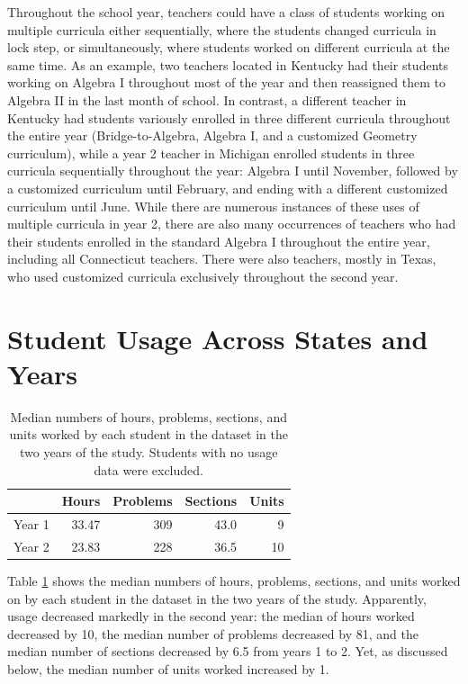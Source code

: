 \documentclass[12pt]{article}\usepackage[]{graphicx}\usepackage[]{color}
\begin{document}
Throughout the school year, teachers could have a class of students
working on multiple curricula either sequentially, where the students
changed curricula in lock step, or simultaneously, where students
worked on different curricula at the same time. As an example, two
teachers located in Kentucky had their students working on Algebra I
throughout most of the year and then reassigned them to Algebra II in
the last month of school. In contrast, a different teacher in Kentucky had students variously
enrolled in three different curricula throughout the entire year
(Bridge-to-Algebra, Algebra I, and a customized Geometry curriculum),
while a year 2 teacher in Michigan enrolled students in
three curricula sequentially throughout the year: Algebra I
until November, followed by a customized curriculum until February, and
ending with a different customized curriculum until June. While there are numerous instances of these
uses of multiple curricula in year 2, there are also many occurrences
of teachers who had their students enrolled in the standard Algebra I
throughout the entire year, including all Connecticut teachers.
There were also teachers, mostly in Texas, who used customized
curricula exclusively throughout the
second year.

\section{Student Usage Across States and Years}\label{sec:usage}

\begin{table}[ht]
\centering
\begin{tabular}{rrrrr}
  \hline
 & Hours & Problems & Sections & Units \\ 
  \hline
Year 1 & 33.47 & 309 & 43.0 & 9 \\ 
  Year 2 & 23.83 & 228 & 36.5 & 10 \\ 
   \hline
\end{tabular}
\caption{Median numbers of hours, problems, sections, and units worked by each student in the dataset in the two years of the study. Students with no usage data were excluded.} 
\label{tab:medUsage}
\end{table}



Table \ref{tab:medUsage} shows the median numbers of hours,
problems, sections, and units worked on by each student in the dataset
in the two years of the study.
Apparently, usage decreased markedly in the second year: the median
of hours worked decreased by
10, the median number of problems decreased by
81, and
the median number of sections decreased by
6.5 from
years 1 to 2.
Yet, as discussed below, the median number of units worked increased
by 1.
\end{document}
